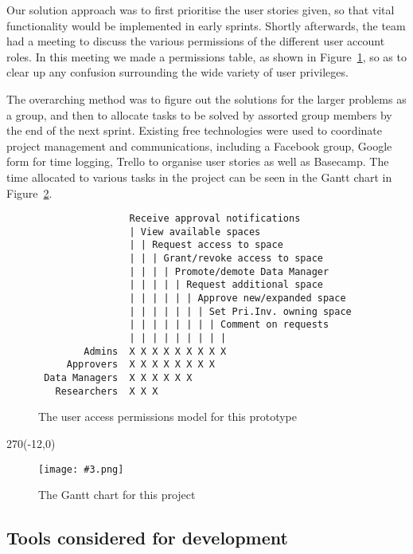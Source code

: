 \documentclass[a4paper,titlepage,12pt]{article}
\newcommand\figimg[4][\textwidth]{
	\begin{figure}
		\caption{#4}
		\label{fig:#2}
		\texttt{[image: \#3.png]}
	\end{figure}
}
\begin{document}
Our solution approach was to first prioritise the user stories given, so that
vital functionality would be implemented in early sprints. Shortly afterwards,
the team had a meeting to discuss the various permissions of the different user
account roles. In this meeting we made a permissions table, as shown in
Figure~\ref{fig:permissions}, so as to clear up any confusion surrounding the
wide variety of user privileges.

The overarching method was to figure out the solutions for the larger problems
as a group, and then to allocate tasks to be solved by assorted group members
by the end of the next sprint. Existing free technologies were used to
coordinate project management and communications, including a Facebook group,
Google form for time logging, Trello to organise user stories as well as
Basecamp. The time allocated to various tasks in the project can be seen in the
Gantt chart in Figure~\ref{fig:gantt}.

\begin{figure}[h]
	\caption{The user access permissions model for this prototype}
	\label{fig:permissions}
\begin{lstlisting}
                Receive approval notifications
                | View available spaces
                | | Request access to space
                | | | Grant/revoke access to space
                | | | | Promote/demote Data Manager
                | | | | | Request additional space
                | | | | | | Approve new/expanded space
                | | | | | | | Set Pri.Inv. owning space
                | | | | | | | | Comment on requests
                | | | | | | | | |
        Admins  X X X X X X X X X
     Approvers  X X X X X X X X
 Data Managers  X X X X X X
   Researchers  X X X
\end{lstlisting}
\end{figure}

\begin{landscape}
	\quad %
	\thispagestyle{empty}
	\begin{textblock}{270}(-12,0)
		\figimg[270mm]{gantt}{gantt}
			{The Gantt chart for this project}
	\end{textblock}
\end{landscape}

\subsection{Tools considered for development}
\end{document}
